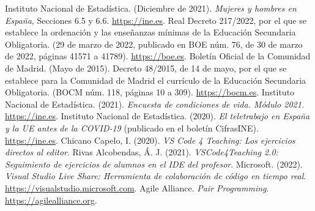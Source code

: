 \renewcommand{\bibname}{Bibliografía}
\begin{thebibliography}{99}
     Instituto Nacional de Estadística. (Diciembre de 2021). \textit{Mujeres y hombres en España}, Secciones 6.5 y 6.6. \href{https://www.ine.es/ss/Satellite?L=es_ES&c=INEPublicacion_C&cid=1259924822888&p=1254735110672&pagename=ProductosYServicios%2FPYSLayout&param1=PYSDetalleGratuitas&param2=1259925527407&param4=Mostrar}{https://ine.es}.
     Real Decreto 217/2022, por el que se establece la ordenación y las enseñanzas mínimas de la Educación Secundaria Obligatoria. (29 de marzo de 2022, publicado en BOE núm. 76, de 30 de marzo de 2022, páginas 41571 a 41789). \href{https://www.boe.es/eli/es/rd/2022/03/29/217}{https://boe.es}.
     Boletín Oficial de la Comunidad de Madrid. (Mayo de 2015). Decreto 48/2015, de 14 de mayo, por el que se establece para la Comunidad de Madrid el currículo de la Educación Secundaria Obligatoria. (BOCM núm. 118, páginas 10 a 309). \href{https://bocm.es/boletin/bocm-20150520-118}{https://bocm.es}.
     Instituto Nacional de Estadística. (2021). \textit{Encuesta de condiciones de vida. Módulo 2021.} \href{https://www.ine.es/dynt3/inebase/index.htm?padre=7989&capsel=7989}{https://ine.es}.
     Instituto Nacional de Estadística. (2020). \textit{El teletrabajo en España y la UE antes de la COVID-19} (publicado en el boletín CifrasINE). \href{https://www.ine.es/ss/Satellite?blobcol=urldata&blobheader=application%2Fpdf&blobheadername1=Content-Disposition&blobheadervalue1=attachment%3B+filename%3Dcfr_022020_v4.pdf&blobkey=urldata&blobtable=MungoBlobs&blobwhere=787%2F725%2Fcfr_022020_v4.pdf&ssbinary=true}{https://ine.es}.
     Chicano Capelo, I. (2020). \textit{VS Code 4 Teaching: Los ejercicios directos al editor}.
     Rivas Alcobendas, Á. J. (2021). \textit{VSCode4Teaching 2.0: Seguimiento de ejercicios de alumnos en el IDE del profesor}.
     Microsoft. (2022). \textit{Visual Studio Live Share: Herramienta de colaboración de código en tiempo real}. \href{https://visualstudio.microsoft.com/es/services/live-share/}{https://visualstudio.microsoft.com}.
     Agile Alliance. \textit{Pair Programming}. \href{https://www.agilealliance.org/glossary/pairing/#q=~(infinite~false~filters~(postType~(~'page~'post~'aa_book~'aa_event_session~'aa_experience_report~'aa_glossary~'aa_research_paper~'aa_video)~tags~(~'pair*20programming))~searchTerm~'~sort~false~sortDirection~'asc~page~1)}{https://agilealliance.org}.


\end{thebibliography}
